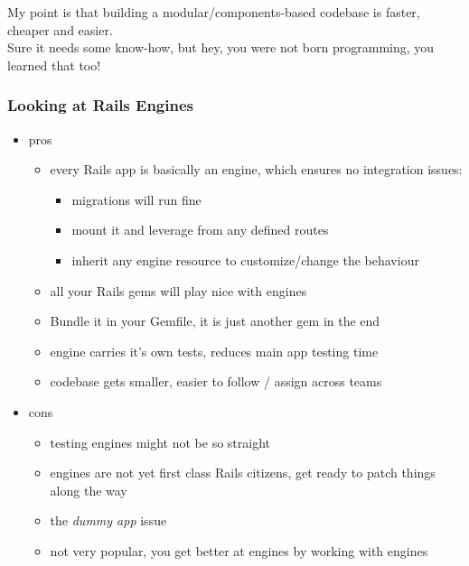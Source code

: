 \documentclass[compress]{beamer}
\begin{document}
\begin{frame}
  \begin{center}
    \huge My point is that building a modular/components-based codebase is faster, cheaper and easier.
    \\
    \small Sure it needs some know-how, but hey, you were not born programming, you learned that too!
  \end{center}
\end{frame}

\begin{frame}
\frametitle{Looking at Rails Engines}

\begin{itemize}[<+->]
  \item pros
    \begin{itemize}
      \item every Rails app is basically an engine, which ensures no integration issues:
        \begin{itemize}
          \item migrations will run fine
          \item mount it and leverage from any defined routes
          \item inherit any engine resource to customize/change the behaviour
        \end{itemize}
      \item all your Rails gems will play nice with engines
      \item Bundle it in your Gemfile, it is just another gem in the end
      \item engine carries it's own tests, reduces main app testing time
      \item codebase gets smaller, easier to follow / assign across teams
    \end{itemize}
  \item cons
    \begin{itemize}
      \item testing engines might not be so straight
      \item engines are not yet first class Rails citizens, get ready to patch things along the way
      \item the \emph{dummy app} issue
      \item not very popular, you get better at engines by working with engines
    \end{itemize}
\end{itemize}
\end{frame}
\end{document}
